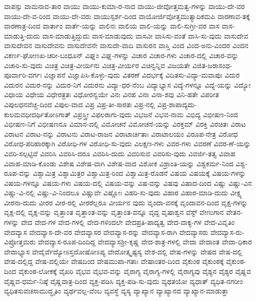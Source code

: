 {ವಾಪಸ್ಸು
ವಾಮನಾವ-ತಾರ
ವಾಯು
ವಾಯು-ಕುಮಾ-ರ-ನಾದ
ವಾಯು-ಜೀವೋತ್ತಮತ್ವ-ಗಳನ್ನು
ವಾಯು-ದೇ-ವರ
ವಾಯು-ದೇ-ವ-ರಿಂದ
ವಾಯು-ದೇ-ವರು
ವಾಯುಸ್ಪರ್ಶ-ದಿಂದ
ವಾಯೋರ್ಜಿವೋತ್ತಮುತ್ಯಾದಿಕಮಪಿ
ವಾರಣಾವ-ತಕ್ಕೆ
ವಾರಣಾತ್ರ-ದಿಂದ
ವಾರ್ತಾಂ
ವಾರ್ತೆ-ಯನ್ನು
ವಾಲಿನಃ
ವಾಲಿಯ
ವಾಲಿ-ಯನ್ನು
ವಾಲಿ-ಸುಗ್ರೀ-ವರ
ವಾಸ
ವಾಸ-ಮಾಡುತ್ತಿ-ದುದು
ವಾಸ-ಮಾಡುತ್ತಿದ್ದುದು
ವಾಸ-ಮಾಡುವುದು
ವಾಸವೀ
ವಾಸಿಸು-ವಂತೆ
ವಾಸಿ-ಸು-ವುದು
ವಾಸುದೇವ
ವಾಸುದೇವನ
ವಾಸುದೇವನು
ವಾಸುದೇವನೇ
ವಾಸುದೇ-ವಾದಿ
ವಾಸುರನ
ವಾಸ್ತಿ
ವಿಂದ
ವಿಂದ-ಅನು-ವಿಂದರ
ವಿಂದನ
ವಿಕರ್ಣ-ಘೋಣಖ-ಚರೀ-ಬಂಧೂನ್
ವಿಘ್ನಂ
ವಿಘ್ನ-ಗಳನ್ನು
ವಿಚಾರ
ವಿಚಾರ-ಗಳು
ವಿಚಾರ-ದಲ್ಲಿ
ವಿಚಾರ-ವನ್ನು
ವಿಚಾರಿ-ಸು-ವುದು
ವಿಚಿತ್ರ
ವಿಚಿತ್ರ-ವೀರ್ಯನು
ವಿಚಿತ್ರ-ವೀರ್ಯರ
ವಿಚಿನ್ವನ್ನಿವ
ವಿಜಯತೇ
ವಿಜಿತ-ಜರಾಸಂಧ-ಪೂರ್ವಾರಿ-ವರ್ಗಃ
ವಿಜ್ಞಾಪನೆ
ವಿಜ್ಞಾಪಿಸಿ-ಕೊಳ್ಳು-ವುದು
ವಿತರಣೆ
ವಿದರ್ಭಕ್ಕೆ
ವಿದಿತಸು-ವಿದ್ಯಾ-ಮವಾಪುಃ
ವಿದುರ
ವಿದುರನ
ವಿದುರ-ನನ್ನು
ವಿದುರ-ನಿಗೆ
ವಿದುರನು
ವಿದ್ಯಾ-ಧರ-ನೆಂಬ
ವಿದ್ಯಾಭ್ಯಾಸ
ವಿದ್ಯೆ-ಗಳನ್ನೂ
ವಿದ್ಯೆ-ಯನ್ನು
ವಿದ್ಯೋ
ವಿಧಾಯ
ವಿಧೇಯ
ವಿಧೇರತ್ರತಃ
ವಿಧೋರನ್ವಯೇ
ವಿನಃ
ವಿನಹ
ವಿನಾ
ವಿನಾ-ಶವು
ವಿನಿ-ಹತೇ
ವಿಪರೀತ
ವಿಪುಲಧನವೆಚ್ಚ-ದಿಂದ
ವಿಪುಲ-ವಾದ
ವಿಪ್ರ
ವಿಪ್ರ-ತೀ-ಸಾರತಃ
ವಿಪ್ರ-ನಲ್ಲಿ
ವಿಪ್ರ-ಶಾಪಾದ್ಯದು-ಕುಲಮವಧೀದರ್ಥಿತೋಽಗಾತ್
ವಿಪ್ರಸ್ತ್ರೀ
ವಿಫಲರಾಗು-ವುದು
ವಿಭಜನೆ
ವಿಭವ-ನಾಮ
ವಿಭಿದ್ಯ
ವಿಭೀಷಣ-ನಿಂದ
ವಿಭೀಷಣ-ನಿಗೆ
ವಿಭೀಷಣನೂ
ವಿಮಾನ-ದಲ್ಲಿ
ವಿಮೋಚನೆ
ವಿಮೋಚನೆ-ಯನ್ನು
ವಿರಕ್ತಮ್
ವಿರಕ್ತಿ
ವಿರಚಿತಃ
ವಿರಾಟ
ವಿರಾಟನ
ವಿರಾಟ-ನನ್ನು
ವಿರಾಟನು
ವಿರಾಟ-ರಾಜನ
ವಿರಾಟಾರ್ಚಿತಾಃ
ವಿರಾಟಾಲಯಂ
ವಿರೂಪ-ನೇತ್ರ
ವಿರೋಧ
ವಿರೋಧ-ಪರಿಹಾರಕ್ಕಾಗಿ
ವಿರೋಧಿ-ಗಳ
ವಿರೋಧಿ-ಸು-ವುದು
ವಿಲಕ್ಷಣ-ಗಳು
ವಿವರ-ಗಳು
ವಿವರಣೆ
ವಿವರ-ಣೆ-ಯನ್ನು
ವಿವರಿ-ಸಲ್ಪಟ್ಟಿವೆ
ವಿವರಿಸಿ
ವಿವರಿಸಿ-ದರೂ
ವಿವರಿಸಿ-ದುದು
ವಿವರಿಸುವ
ವಿವರಿಸು-ವುದು
ವಿವರ್ಜಿ-ತತ್ವ
ವಿವಾಹ
ವಿವಾಹ-ಮಾಡಿ-ಕೊಂಡು
ವಿಶೇಷ
ವಿಶೇಷ-ವಾಗಿ
ವಿಶೇಷ-ವಾದ
ವಿಶೋಕ
ವಿಶ್ರಾಂತಿ-ಯನ್ನು
ವಿಶ್ವಕರ್ಮ-ನಿಂದ
ವಿಶ್ವ-ರೂಪ-ವನ್ನು
ವಿಶ್ವಾಮಿತ್ರ
ವಿಶ್ವಾಮಿತ್ರರ
ವಿಶ್ವಾಮಿತ್ರ-ರಿಂದ
ವಿಶ್ವಾಮಿತ್ರ-ರೊಡನೆ
ವಿಷಯ
ವಿಷಯಕ್ಕೆ
ವಿಷಯ-ಗಳನ್ನು
ವಿಷಯ-ಗಳನ್ನೂ
ವಿಷಯ-ಗಳು
ವಿಷಯ-ದಲ್ಲಿ
ವಿಷಯ-ವನ್ನು
ವಿಷ-ವನ್ನು
ವಿಷವು
ವಿಷಾದ-ದಿಂದ
ವಿಷ್ಣು
ವಿಷ್ಣು-ವಿನ
ವಿಷ್ಣು-ವಿ-ನಲ್ಲಿ
ವಿಷ್ಣು-ವಿ-ನಿಂದಲೂ
ವಿಷ್ಣುವೇ
ವಿಷ್ಣೋಃ
ವಿಹರಿ-ಸು-ವುದು
ವಿಹಾರ
ವಿಹಾರ-ಮಾಡಿ-ದುದು
ವೀಕ್ಷ್ಯ
ವೀರನಾ-ದುದು
ವೀರರ
ವೀರ-ರಲ್ಲಿ
ವೀರರೆಲ್ಲರೂ
ವೀರ್ಯನ
ವುದು
ವೃಂದಾ-ವನಕ್ಕೆ
ವೃಂದಾವನ-ದಿಂದ
ವೃಕ್ಷ-ಗಳನ್ನು
ವೃಕ್ಷ-ದಲ್ಲಿ
ವೃಕ್ಷ-ವನ್ನು
ವೃತ್ತಾಂತ
ವೃತ್ತಾಂತ-ವನ್ನು
ವೃತ್ತಾಂತ-ವನ್ನೂ
ವೃದ್ದ
ವೃಷಾಶ್ವನ
ವೆಸ್ಟ್
ವೇಣುಗಾನ
ವೇತನ-ಗಳನ್ನು
ವೇದ
ವೇದ-ಗಳ
ವೇದ-ಗಳಲ್ಲಿ
ವೇದ-ಗಳಿಂದಲೇ
ವೇದಪ್ರತಿ-ಪಾದ್ಯತ್ವ
ವೇದ-ವಾಕ್ಯ-ಗಳ
ವೇದ-ವಿವೃತಿಂ
ವೇದವ್ಯಾಸ
ವೇದವ್ಯಾಸ-ದೇ-ವರ
ವೇದವ್ಯಾಸರ
ವೇದವ್ಯಾಸ-ರನ್ನು
ವೇದವ್ಯಾಸ-ರಾಗಿ
ವೇದವ್ಯಾಸರು
ವೇದವ್ಯಾಸ-ರು-ವಿಪ್ರೋತ್ತಮರು
ವೇದವ್ಯಾಸ-ರೂಪ-ದಿಂದಿದ್ದ
ವೇದವ್ಯಾಸಶ್ರೀ-ಕೃಷ್ಣ
ವೇದ-ಶಾತ್ರ-ಗಳಲ್ಲಿ
ವೇದಾ
ವೇದಾಂತ
ವೇದಾ-ಧಿಕಾರ
ವೇದಾಭ್ಯಾಸ
ವೇದೈರ್ವೆದ್ಯೋಽಸ್ತದೋಷೋಽಪ್ಯ
ವೇದೋತ್ಕೃಷ್ಟಸ್ಯ
ವೇಶ-ದಲ್ಲಿ
ವೇಷ-ಗಳನ್ನು
ವೇಷದ
ವೇಷ-ದಲ್ಲಿ
ವೇಷ-ದಲ್ಲಿದ್ದ
ವೇಷ-ದಲ್ಲಿಯೇ
ವೇಷದಿಂದ
ವೇಷಮುಪಾ-ಗತಾಃ
ವೇಷಾಂತರ-ದಿಂದ
ವೈಕುಂಠ
ವೈಕುಂಠಕ್ಕೆ
ವೈಕುಂಠ-ದಿಂದ
ವೈಕುಂಠ-ಲೋಕಕ್ಕೆ
ವೈಖರಿ
ವೈಭವ
ವೈಭವ-ವನ್ನು
ವೈರಾಗ್ಯ
ವೈರಾಗ್ಯ-ಗಳಲ್ಲಿ
ವೈರಾಗ್ಯವು
ವೈಶ್ಯನ
ವೈಶ್ಯರ
ವೈಷ್ಣವ
ವೈಷ್ಣವ-ಧರ್ಮ-ನಿಷ್ಠೆ
ವೈಷ್ಣವಾತ್ರ-ದಿಂದ
ವ್ಯಕ್ತ-ಪಡಿಸಿ
ವ್ಯಕ್ತ-ಪಡಿ-ಸು-ವುದು
ವ್ಯಥತಯೋ
ವ್ಯಧಾತ್‌
ವ್ಯಧಿತ-ನಗರೀಂ
ವ್ಯಧಿತಸುವಚಸಾಮುದ್ಧೃತಿಂ
ವ್ಯರ್ಥವಲ್ಲ-ವೆಂಬ
ವ್ಯವಸ್ಥೆ
ವ್ಯಸ್ಯ
ವ್ಯಾಖ್ಯಾನ
ವ್ಯಾಖ್ಯಾನದ
ವ್ಯಾಖ್ಯಾನ-ಮಾಡುತ್ತಾ
}
